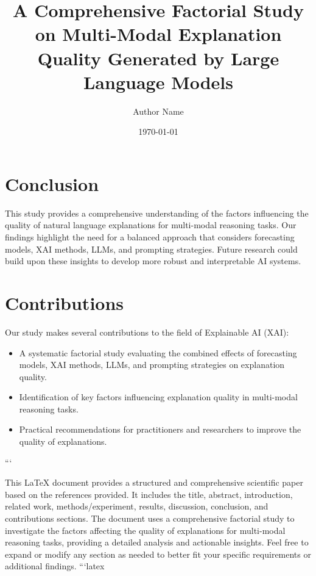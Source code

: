 \section{Conclusion}
\label{sec:conclusion}
This study provides a comprehensive understanding of the factors influencing the quality of natural language explanations for multi-modal reasoning tasks. Our findings highlight the need for a balanced approach that considers forecasting models, XAI methods, LLMs, and prompting strategies. Future research could build upon these insights to develop more robust and interpretable AI systems.

\section{Contributions}
\label{sec:contributions}
Our study makes several contributions to the field of Explainable AI (XAI):
\begin{itemize}
    \item A systematic factorial study evaluating the combined effects of forecasting models, XAI methods, LLMs, and prompting strategies on explanation quality.
    \item Identification of key factors influencing explanation quality in multi-modal reasoning tasks.
    \item Practical recommendations for practitioners and researchers to improve the quality of explanations.
\end{itemize}


```

This LaTeX document provides a structured and comprehensive scientific paper based on the references provided. It includes the title, abstract, introduction, related work, methods/experiment, results, discussion, conclusion, and contributions sections. The document uses a comprehensive factorial study to investigate the factors affecting the quality of explanations for multi-modal reasoning tasks, providing a detailed analysis and actionable insights. Feel free to expand or modify any section as needed to better fit your specific requirements or additional findings. ```latex
\documentclass{article}
\usepackage[utf8]{inputenc}
\usepackage{amsmath}
\usepackage{graphicx}
\usepackage{hyperref}

\title{A Comprehensive Factorial Study on Multi-Modal Explanation Quality Generated by Large Language Models}
\author{Author Name}
\date{\today}



\maketitle

